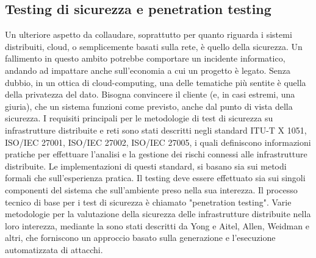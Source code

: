 \subsection{Testing di sicurezza e penetration testing}
Un ulteriore aspetto da collaudare, soprattutto per quanto riguarda i sistemi distribuiti, cloud, o semplicemente basati sulla rete, è quello della sicurezza.
Un fallimento in questo ambito potrebbe comportare un incidente informatico, andando ad impattare anche sull'economia a cui un progetto è legato.
Senza dubbio, in un ottica di cloud-computing, una delle tematiche più sentite è quella della privatezza del dato. Bisogna convincere il cliente (e, in casi estremi, una giuria), che un sistema funzioni come previsto, anche dal punto di vista della sicurezza.
I requisiti principali per le metodologie di test di sicurezza su infrastrutture distribuite e reti sono stati descritti negli standard ITU-T X 1051\cite{disttestITUTX1051}, ISO/IEC 27001\cite{iso27001}, ISO/IEC 27002\cite{iso27002}, ISO/IEC 27005\cite{iso27005}, i quali definiscono informazioni pratiche per effettuare l'analisi e la gestione dei rischi connessi alle infrastrutture distribuite.
Le implementazioni di questi standard, si basano sia sui metodi formali che sull'esperienza pratica. Il testing deve essere effettuato sia sui singoli componenti del sistema che sull'ambiente preso nella sua interezza.
Il processo tecnico di base per i test di sicurezza è chiamato "penetration testing".
Varie metodologie per la valutazione della sicurezza delle infrastrutture distribuite nella loro interezza, mediante la sono stati descritti da Yong e Aitel, Allen, Weidman e altri, che forniscono un approccio basato sulla generazione e l'esecuzione automatizzata di attacchi.\cite{disttest}